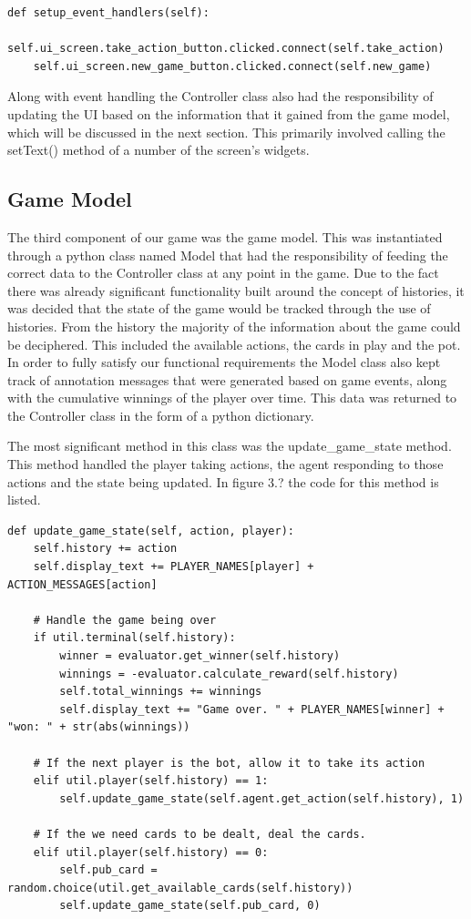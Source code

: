 \begin{lstlisting}[style=Python]
def setup_event_handlers(self):
    self.ui_screen.take_action_button.clicked.connect(self.take_action)
    self.ui_screen.new_game_button.clicked.connect(self.new_game)
\end{lstlisting}

Along with event handling the Controller class also had the responsibility of updating the
UI based on the information that it gained from the game model, which will be discussed in the next section.
This primarily involved calling the setText() method of a number of the screen's widgets.

\subsection{Game Model}\label{subsec:gameModel}
The third component of our game was the game model.
This was instantiated through a python class named Model that had the responsibility of feeding
the correct data to the Controller class at any point in the game.
Due to the fact there was already significant functionality built around the concept of histories,
it was decided that the state of the game would be tracked through the use of histories.
From the history the majority of the information about the game could be deciphered.
This included the available actions, the cards in play and the pot.
In order to fully satisfy our functional requirements the Model class also kept track of annotation messages
that were generated based on game events, along with the cumulative winnings of the player over time.
This data was returned to the Controller class in the
form of a python dictionary.

The most significant method in this class was the update\_game\_state method.
This method handled the player taking actions, the agent responding to those actions and the state being
updated.
In figure 3.? the code for this method is listed.

\begin{lstlisting}[style=Python]
def update_game_state(self, action, player):
    self.history += action
    self.display_text += PLAYER_NAMES[player] + ACTION_MESSAGES[action]

    # Handle the game being over
    if util.terminal(self.history):
        winner = evaluator.get_winner(self.history)
        winnings = -evaluator.calculate_reward(self.history)
        self.total_winnings += winnings
        self.display_text += "Game over. " + PLAYER_NAMES[winner] + "won: " + str(abs(winnings))

    # If the next player is the bot, allow it to take its action
    elif util.player(self.history) == 1:
        self.update_game_state(self.agent.get_action(self.history), 1)

    # If the we need cards to be dealt, deal the cards.
    elif util.player(self.history) == 0:
        self.pub_card = random.choice(util.get_available_cards(self.history))
        self.update_game_state(self.pub_card, 0)
\end{lstlisting}

